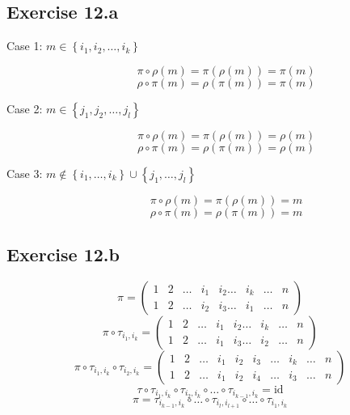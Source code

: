 \documentclass[a4paper]{article}
\theoremstyle{definition}
\newcommand\set[1]{\left\{#1\right\}}
\begin{document}
\subsection{Exercise 12.a}

\begin{description}
  \item[Case 1: $m \in \set{i_1, i_2, \ldots, i_k}$]
    \[ \pi \circ \rho(m) = \pi(\rho(m)) = \pi(m) \]
    \[ \rho \circ \pi(m) = \rho(\pi(m)) = \pi(m) \]
  \item[Case 2: $m \in \set{j_1, j_2, \ldots, j_l}$]
    \[ \pi \circ \rho(m) = \pi(\rho(m)) = \rho(m) \]
    \[ \rho \circ \pi(m) = \rho(\pi(m)) = \rho(m) \]
  \item[Case 3: $m \not\in \set{i_1, \ldots, i_k} \cup \set{j_1, \ldots, j_l}$]
    \[ \pi \circ \rho(m) = \pi(\rho(m)) = m \]
    \[ \rho \circ \pi(m) = \rho(\pi(m)) = m \]
\end{description}

\subsection{Exercise 12.b}
%
\[
  \pi = \begin{pmatrix}
    1 & 2 & \ldots & i_1 & i_2 \ldots & i_k & \ldots & n \\
    1 & 2 & \ldots & i_2 & i_3 \ldots & i_1 & \ldots & n
  \end{pmatrix}
\] \[
  \pi \circ \tau_{i_{1},i_k} = \begin{pmatrix}
    1 & 2 & \ldots & i_1 & i_2 \ldots & i_k & \ldots & n \\
    1 & 2 & \ldots & i_1 & i_3 \ldots & i_2 & \ldots & n
  \end{pmatrix}
\] \[
  \pi \circ \tau_{i_{1},i_k} \circ \tau_{i_2,i_k} = \begin{pmatrix}
    1 & 2 & \ldots & i_1 & i_2 & i_3 & \ldots & i_k & \ldots & n \\
    1 & 2 & \ldots & i_1 & i_2 & i_4 & \ldots & i_3 & \ldots & n
  \end{pmatrix}
\] \[
  \tau \circ \tau_{i_1,i_k} \circ \tau_{i_2,i_k} \circ \ldots \circ \tau_{i_{k-1},i_k} = \text{id}
\] \[
  \pi = \tau_{i_{k-1},i_k} \circ \ldots \circ \tau_{i_l,i_{l+1}} \circ \ldots \circ \tau_{i_1,i_k}
\]
\end{document}
